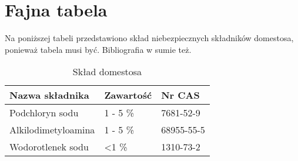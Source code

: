 	\chapter{Fajna tabela}
	Na poniższej tabeli przedstawiono skład niebezpiecznych składników domestosa, ponieważ tabela musi być. Bibliografia w sumie też\cite{HAN2017103}.
	\begin{table}[h!]
	\begin{tabularx}{1.0\textwidth} { |X|X|X| }
	\hline
	Nazwa składnika  & Zawartość & Nr CAS\\
	\hline
	Podchloryn sodu & 1 - 5 \% & 7681-52-9\\
	\hline
	Alkilodimetyloamina & 1 - 5 \% & 68955-55-5\\
	\hline
	Wodorotlenek sodu & \textless 1 \% & 1310-73-2\\
	\hline
	\end{tabularx}
	\caption{Skład domestosa}
	\end{table}